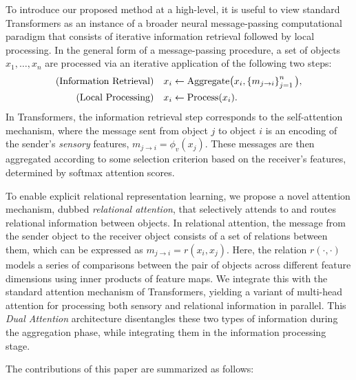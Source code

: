 To introduce our proposed method at a high-level, it is useful to view standard Transformers as an instance of a broader neural message-passing computational paradigm that consists of iterative information retrieval followed by local processing. In the general form of a message-passing procedure, a set of objects $x_1,\ldots, x_n$ are processed via an iterative application of the following two steps:
\begin{equation}\label{eq:intro_message_passing}
  \begin{split}
    \text{(Information Retrieval)} \quad x_i &\gets \mathrm{Aggregate}\big(x_i, \left\{m_{j \to i}\right\}_{j=1}^{n}\big), \\
    \text{(Local Processing)} \quad x_i &\gets \mathrm{Process}(x_i).
  \end{split}
\end{equation}
In Transformers, the information retrieval step corresponds to the self-attention mechanism, where the message sent from object $j$ to object $i$ is an encoding of the sender's \textit{sensory} features, $m_{j \to i} = \phi_v(x_j)$. These messages are then aggregated according to some selection criterion based on the receiver's features, determined by softmax attention scores.

To enable explicit relational representation learning, we propose a novel attention mechanism, dubbed \textit{relational attention}, that selectively attends to and routes relational information between objects. In relational attention, the message from the sender object to the receiver object consists of a set of relations between them, which can be expressed as $m_{j \to i} = r(x_i, x_j)$. Here, the relation $r(\cdot, \cdot)$ models a series of comparisons between the pair of objects across different feature dimensions using inner products of feature maps. We integrate this with the standard attention mechanism of Transformers, yielding a variant of multi-head attention for processing both sensory and relational information in parallel. This \textit{Dual Attention} architecture disentangles these two types of information during the aggregation phase, while integrating them in the information processing stage.

The contributions of this paper are summarized as follows:

